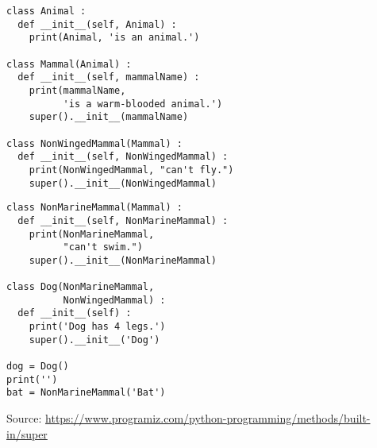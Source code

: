\begin{frame}[fragile]
%
\begin{tcbraster}[raster columns=2,
                  raster equal height,
                  nobeforeafter,
                  raster column skip=0.5cm]
\begin{codebox}
\begin{verbatim}
class Animal :
  def __init__(self, Animal) :
    print(Animal, 'is an animal.')
    
class Mammal(Animal) :
  def __init__(self, mammalName) :
    print(mammalName, 
          'is a warm-blooded animal.')
    super().__init__(mammalName)

class NonWingedMammal(Mammal) :
  def __init__(self, NonWingedMammal) :
    print(NonWingedMammal, "can't fly.")
    super().__init__(NonWingedMammal)
\end{verbatim}
\end{codebox}
%
\begin{codebox}[... (continued)]
\begin{verbatim}
class NonMarineMammal(Mammal) :
  def __init__(self, NonMarineMammal) :
    print(NonMarineMammal, 
          "can't swim.")
    super().__init__(NonMarineMammal)
    
class Dog(NonMarineMammal,
          NonWingedMammal) :
  def __init__(self) :
    print('Dog has 4 legs.')
    super().__init__('Dog')

dog = Dog()
print('')
bat = NonMarineMammal('Bat')
\end{verbatim}
\end{codebox}
\end{tcbraster}
%
\begin{center}
	\scriptsize
	Source:
	\url{https://www.programiz.com/python-programming/methods/built-in/super}
\end{center}
%
\end{frame}


